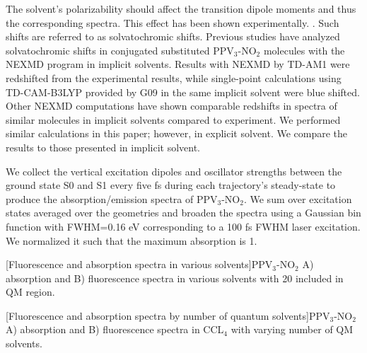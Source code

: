 The solvent's polarizability should affect the transition dipole moments and thus the corresponding spectra.  This effect has been shown experimentally. \cite{marcus1956electrostatic,martin1998hydrolysis,Park2013,LeDroumaguet2005}.
Such shifts are referred to as solvatochromic shifts.
Previous studies have analyzed solvatochromic shifts in conjugated substituted PPV\(_3\)-NO\(_2\) molecules with the NEXMD program in implicit solvents.\cite{Santhanamoorthi2009}
Results with NEXMD by TD-AM1 were redshifted from the experimental results, while single-point calculations using TD-CAM-B3LYP provided by G09 in the same implicit solvent were blue shifted.
Other NEXMD computations have shown comparable redshifts in spectra of similar molecules in implicit solvents compared to experiment. \cite{Bjorgaard2015}
We performed similar calculations in this paper; however, in explicit solvent.
We compare the results to those presented in implicit solvent.

We collect the vertical excitation dipoles and oscillator strengths between the ground state S0 and S1 every five fs during each trajectory's steady-state to produce the absorption/emission spectra of PPV\(_3\)-NO\(_2\).
We sum over excitation states averaged over the geometries and broaden the spectra using a Gaussian bin function with FWHM=0.16 eV corresponding to a 100 fs FWHM laser excitation.
We normalized it such that the maximum absorption is 1. 

\noindent
\begin{multiFigure} 
  [Fluorescence and absorption spectra in various solvents]{PPV\(_3\)-NO\(_2\) A) absorption and B) fluorescence spectra in various solvents with 20 included in QM region.}
  \label{fig:spectrasolvents}
\end{multiFigure}\bigskip

\noindent
\begin{multiFigure} 
  [Fluorescence and absorption spectra by number of quantum solvents]{PPV\(_3\)-NO\(_2\) A) absorption and B) fluorescence spectra in CCL\(_4\) with varying number of QM solvents.}
  \label{fig:spectranquant}
\end{multiFigure}\bigskip

